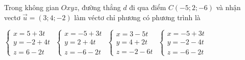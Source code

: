 \documentclass[12pt,a4paper]{article}
\begin{document}
\begin{ex}
 Trong không gian ${Oxyz}$, đường thẳng ${d}$ đi qua điểm ${C(-5;2;-6)}$ và nhận vectơ $\vec{u}=(3;4;-2)$ làm véctơ chỉ phương có phương trình là
 
\choice
{ $\left\{ \begin{array}{l}x = 5+3t\\ y = -2+4t\\z = 6-2t\end{array} \right.$ }
   { \True $\left\{ \begin{array}{l}x = -5+3t\\ y = 2+4t\\z = -6-2t\end{array} \right.$ }
     { $\left\{ \begin{array}{l}x = 3-5t\\ y = 4+2t\\z = -2-6t\end{array} \right.$ }
    { $\left\{ \begin{array}{l}x = -5+3t\\ y = -2-4t\\z = -6-2t\end{array} \right.$ }
\end{ex}
\end{document}
